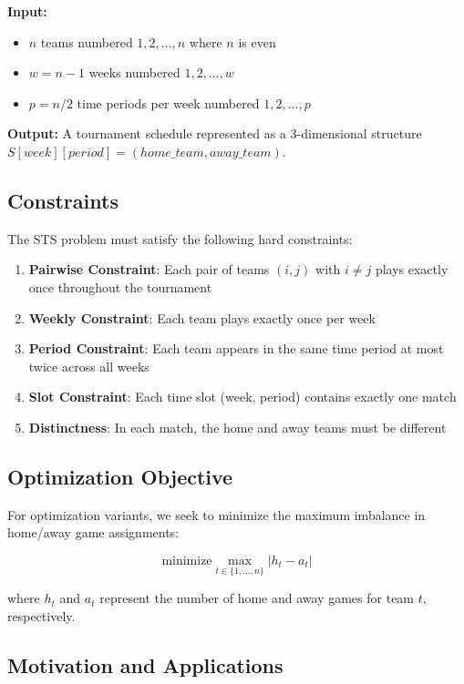 \documentclass[11pt]{article}
\begin{document}
\textbf{Input:}
\begin{itemize}
    \item $n$ teams numbered $1, 2, \ldots, n$ where $n$ is even
    \item $w = n-1$ weeks numbered $1, 2, \ldots, w$
    \item $p = n/2$ time periods per week numbered $1, 2, \ldots, p$
\end{itemize}

\textbf{Output:}
A tournament schedule represented as a 3-dimensional structure $S[week][period] = (home\_team, away\_team)$.

\subsection{Constraints}

The STS problem must satisfy the following hard constraints:

\begin{enumerate}
    \item \textbf{Pairwise Constraint}: Each pair of teams $(i,j)$ with $i \neq j$ plays exactly once throughout the tournament
    \item \textbf{Weekly Constraint}: Each team plays exactly once per week
    \item \textbf{Period Constraint}: Each team appears in the same time period at most twice across all weeks
    \item \textbf{Slot Constraint}: Each time slot (week, period) contains exactly one match
    \item \textbf{Distinctness}: In each match, the home and away teams must be different
\end{enumerate}

\subsection{Optimization Objective}

For optimization variants, we seek to minimize the maximum imbalance in home/away game assignments:

\begin{equation}
\text{minimize} \max_{t \in \{1,\ldots,n\}} |h_t - a_t|
\end{equation}

where $h_t$ and $a_t$ represent the number of home and away games for team $t$, respectively.

\subsection{Motivation and Applications}
\end{document}
